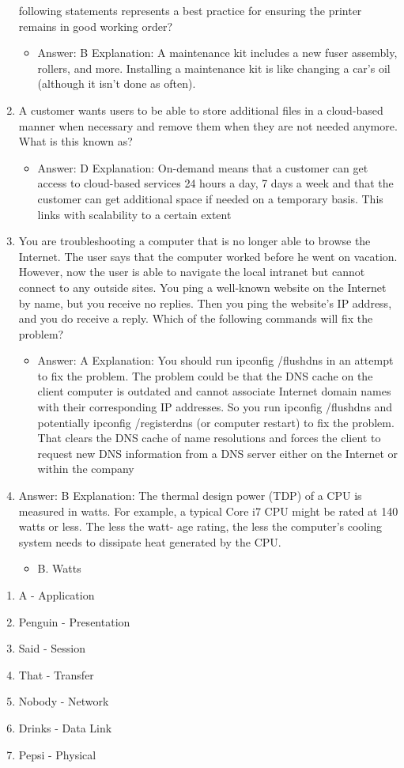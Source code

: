\documentclass{article}
\begin{document}
\begin{enumerate}
following statements represents a best practice for ensuring the
printer remains in good working order?
    \begin{itemize}
        \item Answer: B
Explanation: A maintenance kit includes a new fuser assembly, rollers, and more.
Installing a maintenance kit is like changing a car’s oil (although it isn’t done as often).
    \end{itemize}
    \item A customer wants users to be able to store additional files in a
cloud-based manner when necessary and remove them when they
are not needed anymore. What is this known as?
    \begin{itemize}
        \item Answer: D
Explanation: On-demand means that a customer can get access to cloud-based services
24 hours a day, 7 days a week and that the customer can get additional space if
needed on a temporary basis. This links with scalability to a certain extent
    \end{itemize}
    \item You are troubleshooting a computer that is no longer able to
browse the Internet. The user says that the computer worked
before he went on vacation. However, now the user is able to
navigate the local intranet but cannot connect to any outside sites.
You ping a well-known website on the Internet by name, but you
receive no replies. Then you ping the website’s IP address, and you
do receive a reply. Which of the following commands will fix the
problem?
    \begin{itemize}
        \item Answer: A
Explanation: You should run ipconfig /flushdns in an attempt to fix the problem. The
problem could be that the DNS cache on the client computer is outdated and cannot
associate Internet domain names with their corresponding IP addresses. So you run
ipconfig /flushdns and potentially ipconfig /registerdns (or computer restart) to fix
the problem. That clears the DNS cache of name resolutions and forces the client to
request new DNS information from a DNS server either on the Internet or within the
company
    \end{itemize}
    \item Answer: B
Explanation: The thermal design power (TDP) of a CPU is measured in watts. For
example, a typical Core i7 CPU might be rated at 140 watts or less. The less the watt-
age rating, the less the computer’s cooling system needs to dissipate heat generated
by the CPU.
    \begin{itemize}
        \item B. Watts
    \end{itemize}
\end{enumerate}
\begin{enumerate}
    \item A - Application 
    \item Penguin - Presentation 
    \item Said - Session 
     \item That - Transfer
    \item Nobody - Network 
     \item Drinks - Data Link
    \item Pepsi  - Physical 
\end{enumerate}
\end{document}
